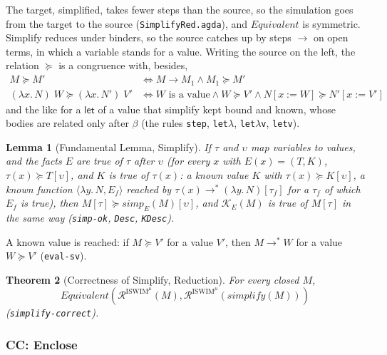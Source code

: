 \documentclass[10pt]{article}
\theoremstyle{acmplain}
\newtheorem{theorem}{Theorem}[section]
\newtheorem{lemma}[theorem]{Lemma}
\newcommand{\key}[1]{\mathsf{#1}}
\newcommand{\pass}[1]{\mathit{#1}}
\newcommand{\lam}[1]{\lambda #1.\,}
\newcommand{\Equiv}{\mathit{Equivalent}}
\newcommand{\Ml}[1]{\textrm{#1}^{\mu}}                  %
\begin{document}
The target, simplified, takes fewer steps than the source, so the
simulation goes from the target to the source (\texttt{SimplifyRed.agda}),
and $\Equiv$ is symmetric. Simplify reduces under binders, so the source
catches up by steps $\to$ on open terms, in which a variable stands for a
value. Writing the source on the left, the relation $\succcurlyeq$ is a
congruence with, besides,
\begin{align*}
  M \succcurlyeq M' &\iff M \to M_1 \land M_1 \succcurlyeq M' \\
  (\lam{x} N)\;W \succcurlyeq (\lam{x} N')\;V' &\iff W \text{ is a value} \land W \succcurlyeq V' \land N[x := W] \succcurlyeq N'[x := V']
\end{align*}
and the like for a $\key{let}$ of a value that simplify kept bound and known,
whose bodies are related only after $\beta$ (the rules \texttt{step},
\texttt{let$\lambda$}, \texttt{let$\lambda$v}, \texttt{letv}).
\begin{lemma}[Fundamental Lemma, Simplify]\label{lem:m-red-simplify-fund}
If $\tau$ and $\upsilon$ map variables to values, and the facts $E$ are true
of $\tau$ after $\upsilon$ (for every $x$ with $E(x) = (T, K)$,
$\tau(x) \succcurlyeq T[\upsilon]$, and $K$ is true of $\tau(x)$: a known value
$K$ with $\tau(x) \succcurlyeq K[\upsilon]$, a known function $\langle \lam{y}
N, E_f \rangle$ reached by $\tau(x) \to^* (\lam{y} N)[\tau_f]$ for a $\tau_f$ of
which $E_f$ is true), then $M[\tau] \succcurlyeq \pass{simp}_E(M)[\upsilon]$,
and $\mathcal{K}_E(M)$ is true of $M[\tau]$ in the same way
(\texttt{simp-ok}, \texttt{Desc}, \texttt{KDesc}).
\end{lemma}
A known value is reached: if $M \succcurlyeq V'$ for a value $V'$, then $M
\to^* W$ for a value $W \succcurlyeq V'$ (\texttt{eval-sv}).
\begin{theorem}[Correctness of Simplify, Reduction]\label{thm:m-red-simplify}
For every closed $M$,
\[ \Equiv(\mathcal{R}^{\Ml{ISWIM}}(M), \mathcal{R}^{\Ml{ISWIM}}(\pass{simplify}(M))) \]
(\texttt{simplify-correct}).
\end{theorem}

\subsubsection{CC: Enclose}
\end{document}
